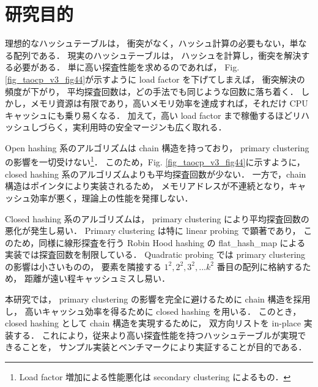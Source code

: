 \section{研究目的}
理想的なハッシュテーブルは，
衝突がなく，ハッシュ計算の必要もない，単なる配列である．
現実のハッシュテーブルは，
ハッシュを計算し，衝突を解決する必要がある．
単に高い探査性能を求めるのであれば，
Fig. \ref{fig_taocp_v3_fig44}が示すように load factor を下げてしまえば，
衝突解決の頻度が下がり，
平均探査回数は，どの手法でも同じような回数に落ち着く．
しかし，メモリ資源は有限であり，高いメモリ効率を達成すれば，それだけ CPU キャッシュにも乗り易くなる．
加えて，高い load factor まで稼働するほどリハッシュしづらく，実利用時の安全マージンも広く取れる．

Open hashing 系のアルゴリズムは chain 構造を持っており，
primary clustering の影響を一切受けない\footnote{Load factor 増加による性能悪化は secondary clustering によるもの．}．
このため，Fig. \ref{fig_taocp_v3_fig44}に示すように，
closed hashing 系のアルゴリズムよりも平均探査回数が少ない．
一方で，chain 構造はポインタにより実装されるため，
メモリアドレスが不連続となり，キャッシュ効率が悪く，理論上の性能を発揮しない．

Closed hashing 系のアルゴリズムは，
primary clustering により平均探査回数の悪化が発生し易い．
Primary clustering は特に linear probing で顕著であり，
このため，同様に線形探査を行う Robin Hood hashing の flat\_hash\_map による実装では探査回数を制限している．
Quadratic probing では primary clustering の影響は小さいものの，
要素を隣接する $1^2, 2^2, 3^2, ... k^2$ 番目の配列に格納するため，
距離が遠い程キャッシュミスし易い．

本研究では，
primary clustering の影響を完全に避けるために chain 構造を採用し，
高いキャッシュ効率を得るために closed hashing を用いる．
このとき，closed hashing として chain 構造を実現するために，
双方向リストを in-place 実装する．
これにより，従来より高い探査性能を持つハッシュテーブルが実現できることを，
サンプル実装とベンチマークにより実証することが目的である．



